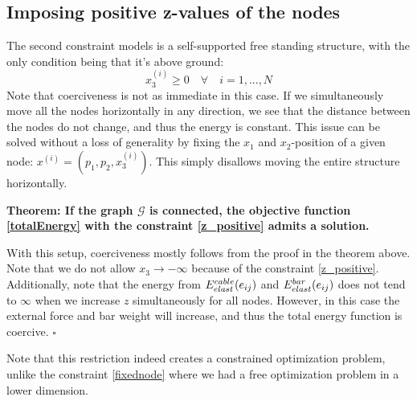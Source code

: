 \subsection{Imposing positive z-values of the nodes}
The second constraint models is a self-supported free standing structure, with the only condition being that it's above ground:
\begin{equation}
    x_3^{(i)} \geq 0 \quad \forall \quad i = 1,...,N
    \label{z_positive}
\end{equation}
Note that coerciveness is not as immediate in this case. If we simultaneously move all the nodes horizontally in any direction, we see that the distance between the nodes do not change, and thus the energy is constant. This issue can be solved without a loss of generality by fixing the $x_1$ and $x_2$-position of a given node: $x^{(i)} = (p_1,p_2,x^{(i)}_3)$. This simply disallows moving the entire structure horizontally.

\textbf{Theorem: If the graph $\mathcal{G}$ is connected, the objective function \eqref{totalEnergy} with the constraint \eqref{z_positive} admits a solution.}

With this setup, coerciveness mostly follows from the proof in the theorem above. Note that we do not allow $x_3 \to -\infty$ because of the constraint \eqref{z_positive}. Additionally, note that the energy from $E^{cable}_{elast}(e_{ij})$ and $E^{bar}_{elast}(e_{ij})$ does not tend to $\infty$ when we increase $z$ simultaneously for all nodes. However, in this case the external force and bar weight will increase, and thus the total energy function is coercive. \hfill $\square$

Note that this restriction indeed creates a constrained optimization problem, unlike the constraint \eqref{fixednode} where we had a free optimization problem in a lower dimension.